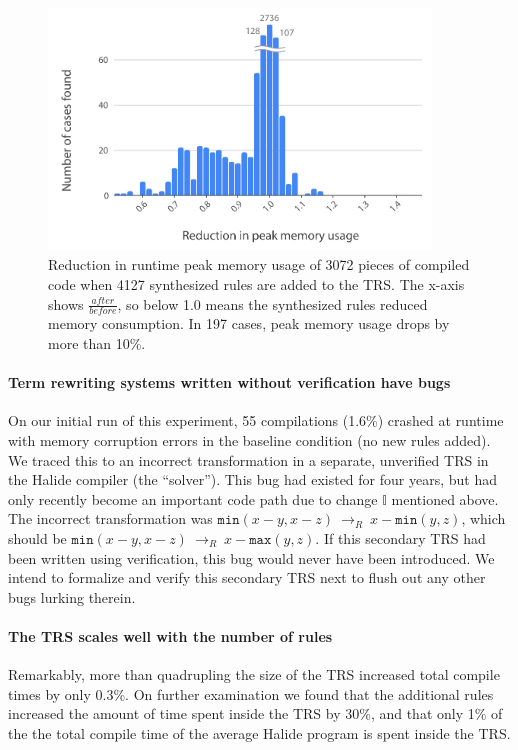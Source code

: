 \documentclass[acmsmall,review]{acmart}\settopmatter{printfolios=true,printccs=false,printacmref=false}
\newcommand{\hmax}[0]{\texttt{max}}
\newcommand{\hmin}[0]{\texttt{min}}
\newcommand{\rewrites}[0]{\:\rightarrow_{R}\:}
\begin{document}
\begin{figure}
  \includegraphics[width=4in]{figures/memoryhistogram.pdf}
\caption{Reduction in runtime peak memory usage of 3072 pieces of compiled
  code when 4127 synthesized rules are added to the TRS. The x-axis
  shows $\frac{after}{before}$, so below 1.0 means the synthesized rules
  reduced memory consumption.  In 197 cases,
  peak memory usage drops by more than 10\%.}
\label{fig:peakmemoryhistogram}
\end{figure}

\paragraph{Term rewriting systems written without verification have bugs}
On our initial run of this experiment, 55 compilations (1.6\%) crashed
at runtime with memory corruption errors in the baseline condition (no
new rules added). We traced this to an incorrect transformation in a
separate, unverified TRS in the Halide compiler (the ``solver''). This
bug had existed for four years, but had only recently become an
important code path due to change $\mathbb{I}$ mentioned above. The
incorrect transformation was $\hmin(x - y, x - z) \rewrites x - \hmin(y, z)$,
which should be $\hmin(x - y, x - z) \rewrites x - \hmax(y, z)$. If this
secondary TRS had been written using verification, this bug would
never have been introduced. We intend to formalize and verify this
secondary TRS next to flush out any other bugs lurking therein.

\paragraph{The TRS scales well with the number of rules}
Remarkably, more than quadrupling the size of the TRS increased total compile
times by only 0.3\%. On further examination we found that the
additional rules increased the amount of time spent inside the TRS by
30\%, and that only 1\% of the the total compile time of the average
Halide program is spent inside the TRS.
\end{document}
